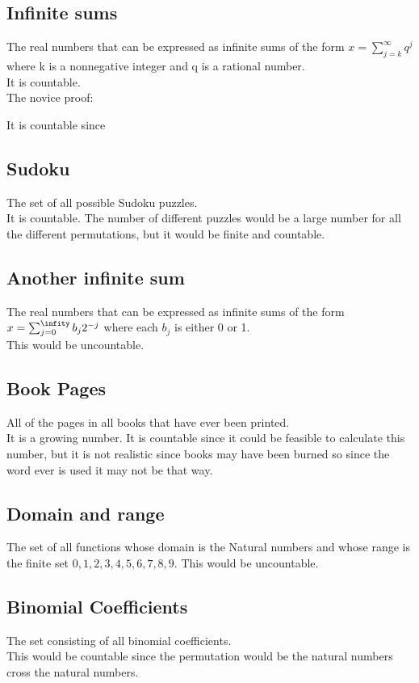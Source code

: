\subsection{Infinite sums}
The real numbers that can be expressed as infinite sums of the form $x= \sum_{j=k}^\infty q^{j}$ where k is a nonnegative integer and q is a rational number. 
\\ 
It is countable. \\ 


The novice proof: 

It is countable since 
\subsection{Sudoku}
The set of all possible Sudoku puzzles.
\\ 
It is countable. The number of different puzzles would be a large number for all the different permutations, but it would be finite and countable. \\ 


\subsection{Another infinite sum} 
The real numbers that can be expressed as infinite sums of the form \\ 
$x= \sum_{j=0}^\infity b_j2^{-j}$ where each $b_j$ is either 0 or 1. \\ 

This would be uncountable. 
\subsection{Book Pages}
All of the pages in all books that have ever been printed. 
\\ 
It is a growing number. It is countable since it could be feasible to calculate this number, but it is not realistic since books may have been burned so since the word ever is used it may not be that way. 

\subsection{Domain and range}
The set of all functions whose domain is the Natural numbers and whose range is the finite set ${0,1,2,3,4,5,6,7,8,9}.$
This would be uncountable. 
\subsection{Binomial Coefficients}
The set consisting of all binomial coefficients.
\\ 
This would be countable since the permutation would be the natural numbers cross the natural numbers. 
